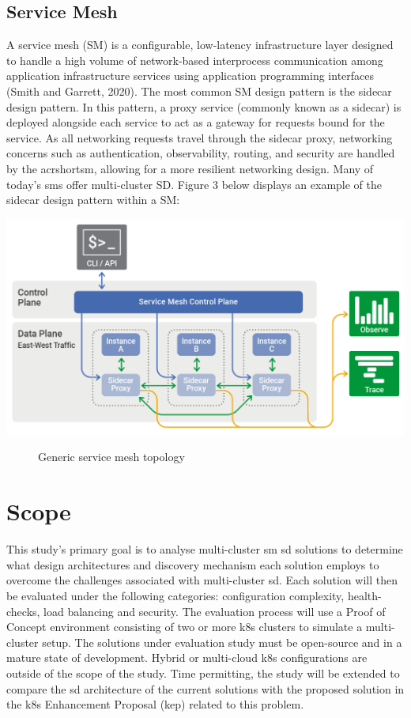 \documentclass[12pt, a4paper, oneside]{article}
\begin{document}
\subsection{Service Mesh}
A service mesh (SM) is a configurable, low‑latency infrastructure layer designed to handle a high volume of network‑based interprocess communication among application infrastructure services using application programming interfaces (Smith and Garrett, 2020). The most common SM design pattern is the sidecar design pattern. In this pattern, a proxy service (commonly known as a sidecar) is deployed alongside each service to act as a gateway for requests bound for the service. As all networking requests travel through the sidecar proxy, networking concerns such as authentication, observability, routing, and security are handled by the acrshort{sm}, allowing for a more resilient networking design. Many of today’s \acrshort{sm}s offer multi-cluster SD. Figure 3 below displays an example of the sidecar design pattern within a SM:

\begin{center}
	\includegraphics[scale=0.4]{images/service-mesh-architecture.png}
	\begin{figure}[hp]
		\caption[Generic service mesh topology]{Generic service mesh topology \citep{sm_image}}
	\end{figure}
\end{center}


\newpage

\section{Scope}
This study's primary goal is to analyse multi-cluster \acrshort{sm} \acrshort{sd} solutions to determine what design architectures and discovery mechanism each solution employs to overcome the challenges associated with multi-cluster \acrshort{sd}. Each solution will then be evaluated under the following categories: configuration complexity, health-checks, load balancing and security. The evaluation process will use a Proof of Concept environment consisting of two or more \acrshort{k8s} clusters to simulate a multi-cluster setup. The solutions under evaluation study must be open-source and in a mature state of development. Hybrid or multi-cloud \acrshort{k8s} configurations are outside of the scope of the study. Time permitting, the study will be extended to compare the \acrshort{sd} architecture of the current solutions with the proposed solution in the \acrshort{k8s} Enhancement Proposal (\acrshort{kep}) related to this problem.
\end{document}
